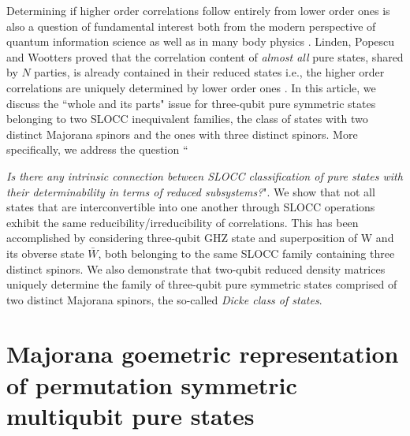 Determining if higher order correlations follow entirely from lower order ones is also a question of fundamental interest both from the modern perspective of quantum information science \cite{SP1,SP2,SP2b} as well as in many body physics \cite{Coleman}. Linden, Popescu and Wootters \cite{SP1,SP2,SP2b} proved that the correlation content of {\em almost all} pure states, shared by $N$ parties, is already contained in their reduced states i.e., the higher order correlations are uniquely determined by lower order ones \cite{SP1,SP2,SP2b}. In this article, we discuss the ``whole and its parts" issue for three-qubit pure symmetric states belonging to two SLOCC inequivalent families, the class of states with two distinct Majorana spinors and the ones with three distinct spinors. More specifically, we address the question ``{\emph{Is there any intrinsic connection between SLOCC classification of pure states with their determinability in terms of reduced subsystems?}". We show that not all states that are interconvertible into one another through SLOCC operations exhibit the same reducibility/irreducibility of correlations. This has been accomplished by considering three-qubit GHZ state and superposition of W and its obverse state $\bar{W}$, both belonging to the same SLOCC family containing three distinct spinors.   We also demonstrate that two-qubit reduced density matrices uniquely determine the family of three-qubit  pure symmetric states comprised of two distinct Majorana spinors, the so-called {\emph {Dicke class of states}}.

\section{Majorana goemetric representation of permutation symmetric multiqubit pure states}\label{chap29-secII} 

}
